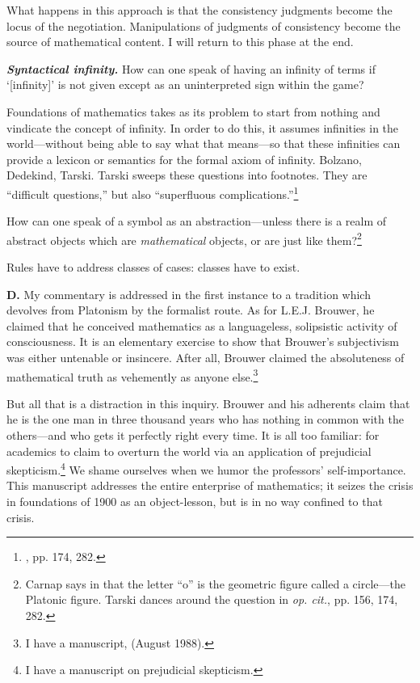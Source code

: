 What happens in this approach is that the consistency judgments become the locus of the negotiation. Manipulations of judgments of consistency become the source of mathematical content. I will return to this phase at the end.

\textbf{\textit{Syntactical infinity.}} How can one speak of having an infinity of terms if `[infinity]' is not given except as an uninterpreted sign within the game?

Foundations of mathematics takes as its problem to start from nothing and vindicate the concept of infinity. In order to do this, it assumes infinities in the world---without being able to say what that means---so that these infinities can provide a lexicon or semantics for the formal axiom of infinity. Bolzano, Dedekind, Tarski. Tarski sweeps these questions into footnotes. They are \enquote{difficult questions,} but also \enquote{superfluous complications.}\footnote{, pp. 174, 282.}

How can one speak of a symbol as an abstraction---unless there is a realm of abstract objects which are \textit{mathematical} objects, or are just like them?\footnote{Carnap says in  that the letter \enquote{o} is the geometric figure called a circle---the Platonic figure. Tarski dances around the question in \textit{op. cit.}, pp. 156, 174, 282.}

Rules have to address classes of cases: classes have to exist.

\jarule

\textbf{D.} My commentary is addressed in the first instance to a tradition which devolves from Platonism by the formalist route. As for L.E.J. Brouwer, he claimed that he conceived mathematics as a languageless, solipsistic activity of consciousness. It is an elementary exercise to show that Brouwer's subjectivism was either untenable or insincere. After all, Brouwer claimed the absoluteness of mathematical truth as vehemently as anyone else.\footnote{I have a manuscript,  (August 1988).}

But all that is a distraction in this inquiry. Brouwer and his adherents claim that he is the one man in three thousand years who has nothing in common with the others---and who gets it perfectly right every time. It is all too familiar: for academics to claim to overturn the world via an application of prejudicial skepticism.\footnote{I have a manuscript on prejudicial skepticism.} We shame ourselves when we humor the professors' self-importance. This manuscript addresses the entire enterprise of mathematics; it seizes the crisis in foundations of 1900 as an object-lesson, but is in no way confined to that crisis.

